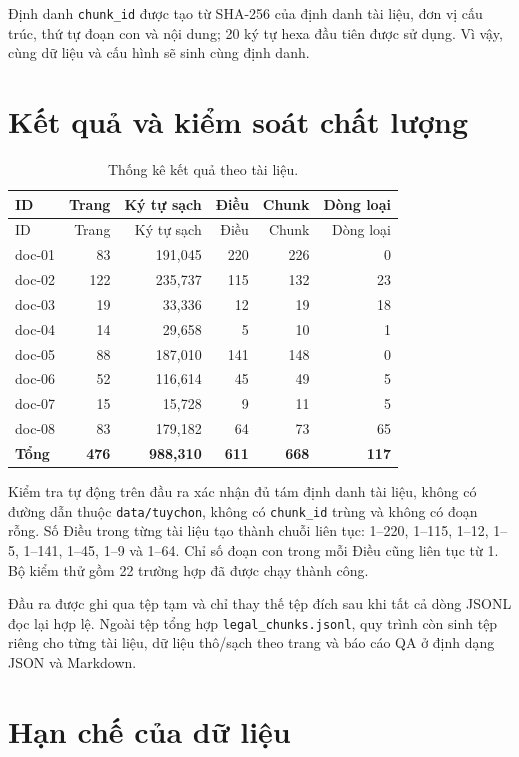 \documentclass[12pt,a4paper]{article}
\newcommand{\code}[1]{\texttt{#1}}
\begin{document}
Định danh \code{chunk\_id} được tạo từ SHA-256 của định danh tài liệu, đơn vị
cấu trúc, thứ tự đoạn con và nội dung; 20 ký tự hexa đầu tiên được sử dụng. Vì
vậy, cùng dữ liệu và cấu hình sẽ sinh cùng định danh.

\section{Kết quả và kiểm soát chất lượng}

\begin{longtable}{>{\ttfamily}lrrrrr}
\caption{Thống kê kết quả theo tài liệu.}\label{tab:results}\\
\toprule
ID & Trang & Ký tự sạch & Điều & Chunk & Dòng loại \\
\midrule
\endfirsthead
\toprule
ID & Trang & Ký tự sạch & Điều & Chunk & Dòng loại \\
\midrule
\endhead
doc-01 & 83  & 191,045 & 220 & 226 & 0  \\
doc-02 & 122 & 235,737 & 115 & 132 & 23 \\
doc-03 & 19  & 33,336  & 12  & 19  & 18 \\
doc-04 & 14  & 29,658  & 5   & 10  & 1  \\
doc-05 & 88  & 187,010 & 141 & 148 & 0  \\
doc-06 & 52  & 116,614 & 45  & 49  & 5  \\
doc-07 & 15  & 15,728  & 9   & 11  & 5  \\
doc-08 & 83  & 179,182 & 64  & 73  & 65 \\
\midrule
\textbf{Tổng} & \textbf{476} & \textbf{988,310} & \textbf{611} & \textbf{668} & \textbf{117} \\
\bottomrule
\end{longtable}

Kiểm tra tự động trên đầu ra xác nhận đủ tám định danh tài liệu, không có đường
dẫn thuộc \code{data/tuychon}, không có \code{chunk\_id} trùng và không có đoạn
rỗng. Số Điều trong từng tài liệu tạo thành chuỗi liên tục: 1--220, 1--115,
1--12, 1--5, 1--141, 1--45, 1--9 và 1--64. Chỉ số đoạn con trong mỗi Điều cũng
liên tục từ 1. Bộ kiểm thử gồm 22 trường hợp đã được chạy thành công.

Đầu ra được ghi qua tệp tạm và chỉ thay thế tệp đích sau khi tất cả dòng JSONL
đọc lại hợp lệ. Ngoài tệp tổng hợp \code{legal\_chunks.jsonl}, quy trình còn sinh
tệp riêng cho từng tài liệu, dữ liệu thô/sạch theo trang và báo cáo QA ở định
dạng JSON và Markdown.

\section{Hạn chế của dữ liệu}
\end{document}
